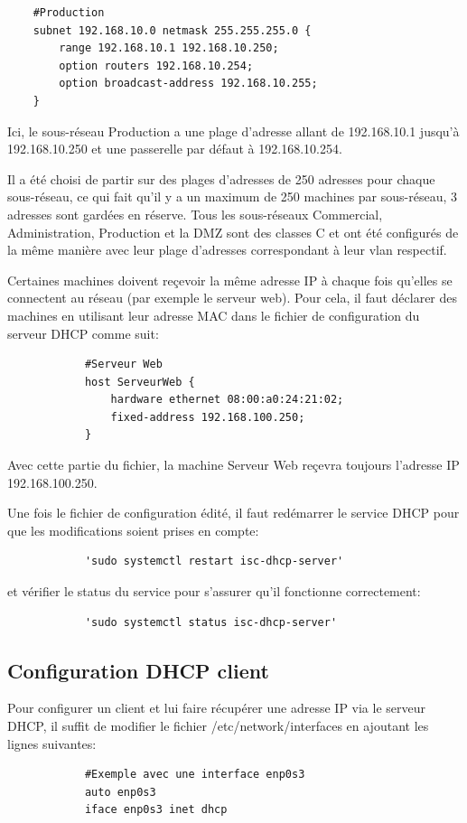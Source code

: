 \documentclass[a4paper,12pt,openany]{report}
\begin{document}
    \begin{verbatim}
    #Production
    subnet 192.168.10.0 netmask 255.255.255.0 {
        range 192.168.10.1 192.168.10.250;
        option routers 192.168.10.254;
        option broadcast-address 192.168.10.255;
    }
    \end{verbatim}

                
            Ici, le sous-réseau Production a une plage d'adresse allant de 192.168.10.1 jusqu'à 192.168.10.250 et une passerelle par défaut à 192.168.10.254.

            Il a été choisi de partir sur des plages d'adresses de 250 adresses pour chaque sous-réseau, ce qui fait qu'il y a un maximum de 250 machines par sous-réseau, 3 adresses sont gardées en réserve.
            Tous les sous-réseaux Commercial, Administration, Production et la DMZ sont des classes C et ont été configurés de la même manière avec leur plage d'adresses correspondant à leur vlan respectif.

            Certaines machines doivent reçevoir la même adresse IP à chaque fois qu'elles se connectent au réseau (par exemple le serveur web).
            Pour cela, il faut déclarer des machines en utilisant leur adresse MAC dans le fichier de configuration du serveur DHCP comme suit:

            \begin{verbatim}
            #Serveur Web
            host ServeurWeb {
                hardware ethernet 08:00:a0:24:21:02;
                fixed-address 192.168.100.250;
            }
            \end{verbatim}

            Avec cette partie du fichier, la machine Serveur Web reçevra toujours l'adresse IP 192.168.100.250.

            Une fois le fichier de configuration édité, il faut redémarrer le service DHCP pour que les modifications soient prises en compte:
            \begin{verbatim}
            'sudo systemctl restart isc-dhcp-server'
            \end{verbatim}
            et vérifier le status du service pour s'assurer qu'il fonctionne correctement:
            \begin{verbatim}
            'sudo systemctl status isc-dhcp-server'
            \end{verbatim}

            \subsection{Configuration DHCP client}
            Pour configurer un client et lui faire récupérer une adresse IP via le serveur DHCP, il suffit de modifier le fichier /etc/network/interfaces en ajoutant les lignes suivantes:
            \begin{verbatim}
            #Exemple avec une interface enp0s3
            auto enp0s3
            iface enp0s3 inet dhcp
            \end{verbatim}
\end{document}
